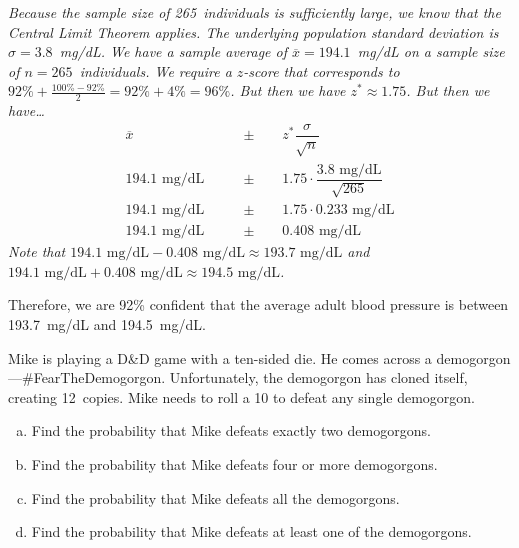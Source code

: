 \documentclass[12pt,letterpaper]{exam}
\begin{document}
\begin{questions}
{\itshape Because the sample size of 265~individuals is sufficiently large, we know that the Central Limit Theorem applies. The underlying population standard deviation is $\sigma= 3.8$~mg/dL. We have a sample average of $\overline{x}= 194.1$~mg/dL on a sample size of $n= 265$~individuals. We require a $z$-score that corresponds to $92\% + \frac{100\% - 92\%}{2}= 92\% + 4\%= 96\%$. But then we have $z^* \approx 1.75$. But then we have\dots
	\[
	\begin{aligned}
	\overline{x} \qquad&\pm\qquad z^* \dfrac{\sigma}{\sqrt{n}} \\[0.3cm]
	194.1 \text{ mg/dL} \qquad&\pm\qquad 1.75 \cdot \dfrac{3.8 \text{ mg/dL}}{\sqrt{265}} \\[0.3cm]
	194.1 \text{ mg/dL} \qquad&\pm\qquad 1.75 \cdot 0.233 \text{ mg/dL} \\[0.3cm]
	194.1 \text{ mg/dL} \qquad&\pm\qquad 0.408 \text{ mg/dL} 
	\end{aligned}
	\] \pspace
Note that $194.1 \text{ mg/dL} - 0.408 \text{ mg/dL} \approx 193.7 \text{ mg/dL}$ and $194.1 \text{ mg/dL} + 0.408 \text{ mg/dL} \approx 194.5 \text{ mg/dL}$. \pspace

Therefore, we are 92\% confident that the average adult blood pressure is between 193.7~mg/dL and 194.5~mg/dL. 
}



\newpage
\question[10] Mike is playing a D\&D game with a ten-sided die. He comes across a demogorgon---\#FearTheDemogorgon. Unfortunately, the demogorgon has cloned itself, creating 12~copies. Mike needs to roll a 10 to defeat any single demogorgon. 
	\begin{enumerate}[(a)]
	\item Find the probability that Mike defeats exactly two demogorgons.
	\item Find the probability that Mike defeats four or more demogorgons.
	\item Find the probability that Mike defeats all the demogorgons.
	\item Find the probability that Mike defeats at least one of the demogorgons. 
	\end{enumerate} \pspace

\end{questions}
\end{document}
